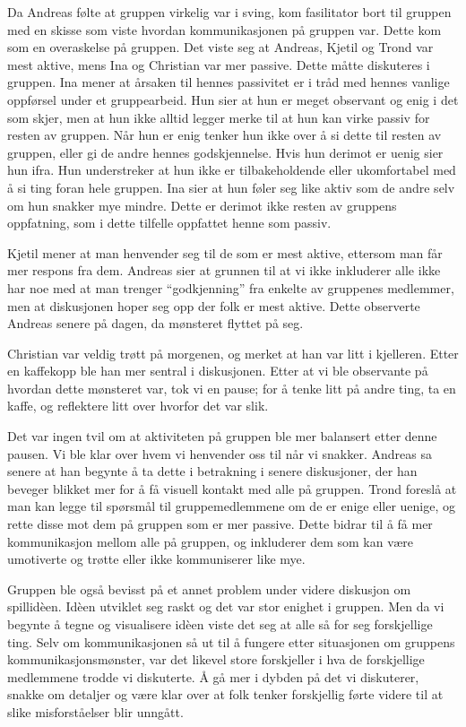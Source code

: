 Da Andreas følte at gruppen virkelig var i sving, kom fasilitator bort til gruppen med en skisse som viste hvordan kommunikasjonen på gruppen var.
Dette kom som en overaskelse på gruppen. Det viste seg at Andreas, Kjetil og Trond var mest aktive, mens Ina og Christian var mer passive. Dette måtte diskuteres i gruppen.
Ina mener at årsaken til hennes passivitet er i tråd med hennes vanlige oppførsel under et gruppearbeid. Hun sier at hun er meget observant og enig i det som skjer, men at hun ikke alltid legger merke til at hun kan virke passiv for resten av gruppen. Når hun er enig tenker hun ikke over å si dette til resten av gruppen, eller gi de andre hennes godskjennelse. Hvis hun derimot er uenig sier hun ifra. Hun understreker at hun ikke er tilbakeholdende eller ukomfortabel med å si ting foran hele gruppen. Ina sier at hun føler seg like aktiv som de andre selv om hun snakker mye mindre. Dette er derimot ikke resten av gruppens oppfatning, som i dette tilfelle oppfattet henne som passiv. 

Kjetil mener at man henvender seg til de som er mest aktive, ettersom man får mer respons fra dem. Andreas sier at grunnen til at vi ikke inkluderer alle ikke har noe med at man trenger “godkjenning” fra enkelte av gruppenes medlemmer, men at diskusjonen hoper seg opp der folk er mest aktive. Dette observerte Andreas senere på dagen, da mønsteret flyttet på seg. 

Christian var veldig trøtt på morgenen, og merket at han var litt i kjelleren. Etter en kaffekopp ble han mer sentral i diskusjonen. Etter at vi ble observante på hvordan dette mønsteret var, tok vi en pause; for å tenke litt på andre ting, ta en kaffe, og reflektere litt over hvorfor det var slik. 

Det var ingen tvil om at aktiviteten på gruppen ble mer balansert etter denne pausen. Vi ble klar over hvem vi henvender oss til når vi snakker. Andreas sa senere at han begynte å ta dette i betrakning i senere diskusjoner, der han beveger blikket mer for å få visuell kontakt med alle på gruppen. Trond foreslå at man kan legge til spørsmål til gruppemedlemmene om de er enige eller uenige, og rette disse mot dem på gruppen som er mer passive. Dette bidrar til å få mer kommunikasjon mellom alle på gruppen, og inkluderer dem som kan være umotiverte og trøtte eller ikke kommuniserer like mye. 

Gruppen ble også bevisst på et annet problem under videre diskusjon om spillidèen. Idèen utviklet seg raskt og det var stor enighet i gruppen. Men da vi begynte å tegne og visualisere idèen viste det seg at alle så for seg forskjellige ting. Selv om kommunikasjonen så ut til å fungere etter situasjonen om gruppens kommunikasjonsmønster, var det likevel store forskjeller i hva de forskjellige medlemmene trodde vi diskuterte. Å gå mer i dybden på det vi diskuterer, snakke om detaljer og være klar over at folk tenker forskjellig førte videre til at slike misforståelser blir unngått.

 \cite{Johnson}